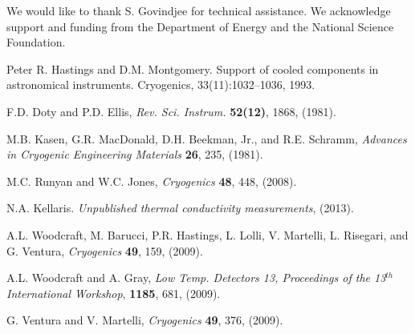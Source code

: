 \documentclass[final]{svjour2}
\begin{document}
\begin{acknowledgements}
We would like to thank S. Govindjee for technical assistance. We acknowledge support and funding from the Department of Energy and the National Science Foundation.
\end{acknowledgements}

\begin{thebibliography}{99}

Peter R. Hastings and D.M. Montgomery. Support of cooled components in astronomical instruments. Cryogenics, 33(11):1032–1036, 1993.


F.D. Doty and P.D. Ellis, {\it Rev. Sci. Instrum.} \textbf{52(12)}, 1868, (1981).

M.B. Kasen, G.R. MacDonald, D.H. Beekman, Jr., and R.E. Schramm, {\it Advances in Cryogenic Engineering Materials} \textbf{26}, 235, (1981). 


M.C. Runyan and W.C. Jones, {\it Cryogenics} \textbf{48}, 448, (2008).

N.A. Kellaris. {\it Unpublished thermal conductivity measurements}, (2013).

A.L. Woodcraft, M. Barucci, P.R. Hastings, L. Lolli, V. Martelli, L. Risegari, and G. Ventura, {\it Cryogenics} \textbf{49}, 159, (2009).

A.L. Woodcraft and A. Gray, {\it Low Temp. Detectors 13, Proceedings of the 13$^{th}$ International Workshop}, \textbf{1185}, 681, (2009).

G. Ventura and V. Martelli, {\it Cryogenics} \textbf{49}, 376, (2009).

\end{thebibliography}
\end{document}
